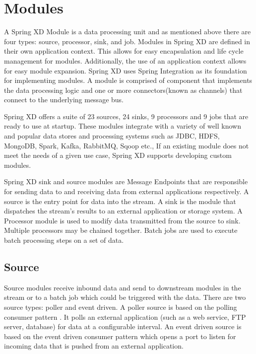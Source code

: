 \section{Modules}
\label{sec:Modules}
A Spring XD Module \cite{modules} is a data processing unit and as mentioned above
there are four types: source, processor, sink, and job. Modules in Spring XD are defined 
in their own application context. This allows for easy encapsulation and life cycle 
management for modules. Additionally, the use of an application context allows for easy 
module expansion.  Spring XD uses Spring Integration \cite{spring-integration-reference} 
as its foundation for implementing modules. A module is comprised of component that
implements the data processing logic and one or more connectors(known as channels)
that connect to the underlying message bus.

\par

Spring XD offers a suite of 23 sources, 24 sinks, 9 processors and 9 jobs that are ready 
to use at startup.  These modules integrate with a variety of well known and popular
data stores and processing systems such as JDBC, HDFS, MongoDB, Spark, Kafka, RabbitMQ,
Sqoop etc.,  If an existing module does not meet the needs of a given use case, Spring XD
supports developing custom modules.

Spring XD sink and source modules are Message Endpoints 
\cite{enterprise-integration-pattern-message-endpoint} 
that are responsible for sending data to and receiving data from external applications
respectively. A source is the entry point for data into the stream. A sink is the module that dispatches
the stream's results to an external application or storage system. A Processor
module is used to modify data transmitted from the source to sink. Multiple processors may be chained together.
Batch jobs are used to execute batch processing steps on a set of data.

\par

\subsection{Source}
Source modules receive inbound data and send to downstream modules in the stream or to a batch job
which could be triggered with the data. There are two source types: poller and event driven.
A poller source is based on the polling consumer pattern \cite{enterprise-integration-pattern-pollingconsumer}.
It polls an external application (such as a web service, FTP server, database) for data at a
configurable interval. An event driven source is based on the event driven
consumer pattern \cite{enterprise-integration-pattern-eventdrivenconsumer} which
opens a port to listen for incoming data that is pushed from an external application.

